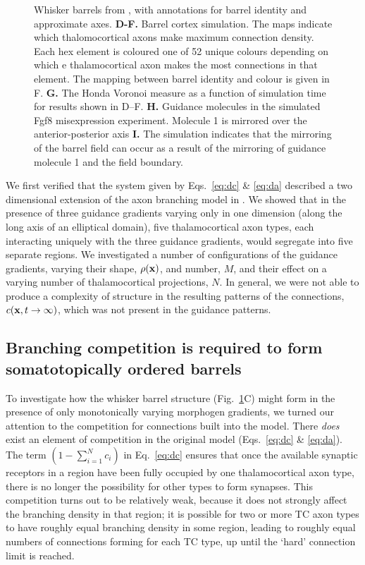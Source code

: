 \documentclass[9pt,twocolumn,twoside,lineno]{pnas-new}
\begin{document}
\begin{figure}
{  Whisker barrels from \cite{shimogori_fibroblast_2005}, with annotations for
  barrel identity and approximate axes.  \textbf{D-F.} Barrel cortex
  simulation. The maps indicate which thalomocortical axons make maximum
  connection density. Each hex element is coloured one of 52 unique colours
  depending on which e thalamocortical axon makes the most connections in that
  element. The mapping between barrel identity and colour is given in F.
  \textbf{G.} The Honda Voronoi measure as a function of simulation time for
  results shown in D--F. \textbf{H.}  Guidance molecules in the simulated Fgf8
  misexpression experiment. Molecule 1 is mirrored over the anterior-posterior
  axis \textbf{I.} The simulation indicates that the mirroring of the barrel
  field can occur as a result of the mirroring of guidance molecule 1 and the
  field boundary.}
\label{fig} %
\end{figure}


We first verified that the system given by Eqs.~\ref{eq:dc} \& \ref{eq:da}
described a two dimensional extension of the axon branching model in
\cite{karbowski_model_2004}. We showed that in the presence of three guidance
gradients varying only in one dimension (along the long axis of an elliptical
domain), five thalamocortical axon types, each interacting uniquely with the
three guidance gradients, would segregate into five separate regions. We
investigated a number of configurations of the guidance gradients, varying
their shape, $\rho(\mathbf{x})$, and number, $M$, and their effect on a varying
number of thalamocortical projections, $N$. In general, we were not able to
produce a complexity of structure in the resulting patterns of the
connections, $c(\mathbf{x},t\rightarrow\infty)$, which was not present in the
guidance patterns.


\subsection*{Branching competition is required to form somatotopically ordered barrels}

To investigate how the whisker barrel structure (Fig.~\ref{fig}C) might
form in the presence of only monotonically varying morphogen gradients, we
turned our attention to the competition for connections built into the
model. There \emph{does} exist an element of competition in the original model
(Eqs.~\ref{eq:dc} \& \ref{eq:da}). The term $\left(1 - \sum_{i=1}^{N}
c_i\right)$ in Eq.~\ref{eq:dc} ensures that once the available synaptic
receptors in a region have been fully occupied by one thalamocortical axon
type, there is no longer the possibility for other types to form
synapses. This competition turns out to be relatively weak, because it does
not strongly affect the branching density in that region; it is possible for
two or more TC axon types to have roughly equal branching density in some
region, leading to roughly equal numbers of connections forming for each TC
type, up until the `hard' connection limit is reached.
\end{document}
